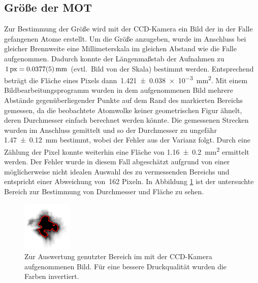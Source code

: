 \documentclass[11pt, a4paper]{article}
\numberwithin{equation}{section}
\newcommand{\korr}[1]{{\color{red}(#1)}}
\begin{document}
\subsection{Größe der MOT}
Zur Bestimmung der Größe wird mit der CCD-Kamera ein Bild der in der Falle gefangenen Atome erstellt.
Um die Größe anzugeben, wurde im Anschluss bei gleicher Brennweite eine Millimeterskala im gleichen Abstand wie die Falle aufgenommen.
Dadurch konnte der Längenmaßstab der Aufnahmen zu~$\SI{1}{px}=\SI{0,0377+-0,0005}{mm}$ \korr{evtl.\ Bild von der Skala} bestimmt werden.
Entsprechend beträgt die Fläche eines Pixels dann~\SI{1.421+-0.038e-3}{mm^2}.
Mit einem Bildbearbeitungsprogramm wurden in dem aufgenommenen Bild mehrere Abstände gegenüberliegender Punkte auf dem Rand des markierten Bereichs gemessen, da die beobachtete Atomwolke keiner geometrischen Figur ähnelt, deren Durchmesser einfach berechnet werden könnte.
Die gemessenen Strecken wurden im Anschluss gemittelt und so der Durchmesser zu ungefähr \SI{1,47+-0,12}{mm} bestimmt, wobei der Fehler aus der Varianz folgt.
Durch eine Zählung der Pixel konnte weiterhin eine Fläche von \SI{1,16+-0,2}{mm^2} ermittelt werden.
Der Fehler wurde in diesem Fall abgeschätzt aufgrund von einer möglicherweise nicht idealen Auswahl des zu vermessenden Bereichs und entspricht einer Abweichung von~\num{162} Pixeln.
In Abbildung \ref{fig:mot_groesse} ist der untersuchte Bereich zur Bestimmung von Durchmesser und Fläche zu sehen.
\begin{figure}[h]
	\centering
	\includegraphics[width=.7\textwidth]{./figures/size_inverted.png}
	\caption{Zur Auswertung genutzter Bereich im mit der CCD-Kamera aufgenommenen Bild. Für eine bessere Druckqualität wurden die Farben invertiert.}
	\label{fig:mot_groesse}
\end{figure}
\end{document}
